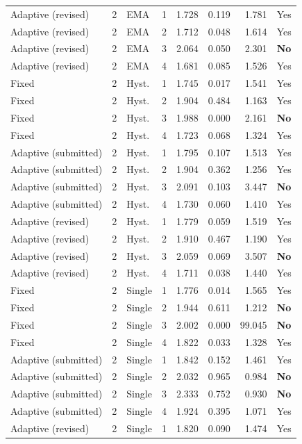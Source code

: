 {\begin{longtable}{lllrrrrl}
Adaptive (revised) & 2 & EMA & 1 & 1.728 & 0.119 & 1.781 & Yes\\
Adaptive (revised) & 2 & EMA & 2 & 1.712 & 0.048 & 1.614 & Yes\\
Adaptive (revised) & 2 & EMA & 3 & 2.064 & 0.050 & 2.301 & \textbf{No}\\
Adaptive (revised) & 2 & EMA & 4 & 1.681 & 0.085 & 1.526 & Yes\\
Fixed & 2 & Hyst. & 1 & 1.745 & 0.017 & 1.541 & Yes\\
Fixed & 2 & Hyst. & 2 & 1.904 & 0.484 & 1.163 & Yes\\
Fixed & 2 & Hyst. & 3 & 1.988 & 0.000 & 2.161 & \textbf{No}\\
Fixed & 2 & Hyst. & 4 & 1.723 & 0.068 & 1.324 & Yes\\
Adaptive (submitted) & 2 & Hyst. & 1 & 1.795 & 0.107 & 1.513 & Yes\\
Adaptive (submitted) & 2 & Hyst. & 2 & 1.904 & 0.362 & 1.256 & Yes\\
Adaptive (submitted) & 2 & Hyst. & 3 & 2.091 & 0.103 & 3.447 & \textbf{No}\\
Adaptive (submitted) & 2 & Hyst. & 4 & 1.730 & 0.060 & 1.410 & Yes\\
Adaptive (revised) & 2 & Hyst. & 1 & 1.779 & 0.059 & 1.519 & Yes\\
Adaptive (revised) & 2 & Hyst. & 2 & 1.910 & 0.467 & 1.190 & Yes\\
Adaptive (revised) & 2 & Hyst. & 3 & 2.059 & 0.069 & 3.507 & \textbf{No}\\
Adaptive (revised) & 2 & Hyst. & 4 & 1.711 & 0.038 & 1.440 & Yes\\
Fixed & 2 & Single & 1 & 1.776 & 0.014 & 1.565 & Yes\\
Fixed & 2 & Single & 2 & 1.944 & 0.611 & 1.212 & \textbf{No}\\
Fixed & 2 & Single & 3 & 2.002 & 0.000 & 99.045 & \textbf{No}\\
Fixed & 2 & Single & 4 & 1.822 & 0.033 & 1.328 & Yes\\
Adaptive (submitted) & 2 & Single & 1 & 1.842 & 0.152 & 1.461 & Yes\\
Adaptive (submitted) & 2 & Single & 2 & 2.032 & 0.965 & 0.984 & \textbf{No}\\
Adaptive (submitted) & 2 & Single & 3 & 2.333 & 0.752 & 0.930 & \textbf{No}\\
Adaptive (submitted) & 2 & Single & 4 & 1.924 & 0.395 & 1.071 & Yes\\
Adaptive (revised) & 2 & Single & 1 & 1.820 & 0.090 & 1.474 & Yes\\

\end{longtable}}
